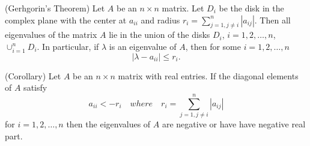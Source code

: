 \begin{atheorem}(Gerhgorin's Theorem)
Let $A$ be an $n\times n$ matrix. Let $D_i$ be the disk in the complex plane with the center at $a_{ii}$ and radius $r_i=\sum _{j=1,j\not =i}^n|a_{ij}|$. Then all eigenvalues of the matrix $A$ lie in the union of the disks $D_i$, $i=1,2,\dots, n$, $\cup_{i=1}^nD_i$. In particular, if $\lambda $ is an eigenvalue of $A$, then for some $i=1,2,\dots,n$
$$|\lambda -a_{ii}|\leq r_i.$$
\end{atheorem}

\begin{atheorem}(Corollary)
Let $A$ be an $n\times n$ matrix with real entries. If the diagonal elements of $A$ satisfy 
$$a_{ii}<-r_{i} \quad where \quad r_i=\sum _{j=1,j\not =i}^n|a_{ij}|$$
for $i=1,2,\dots,n$ then the eigenvalues of $A$ are negative or have have negative real part.
\end{atheorem}


